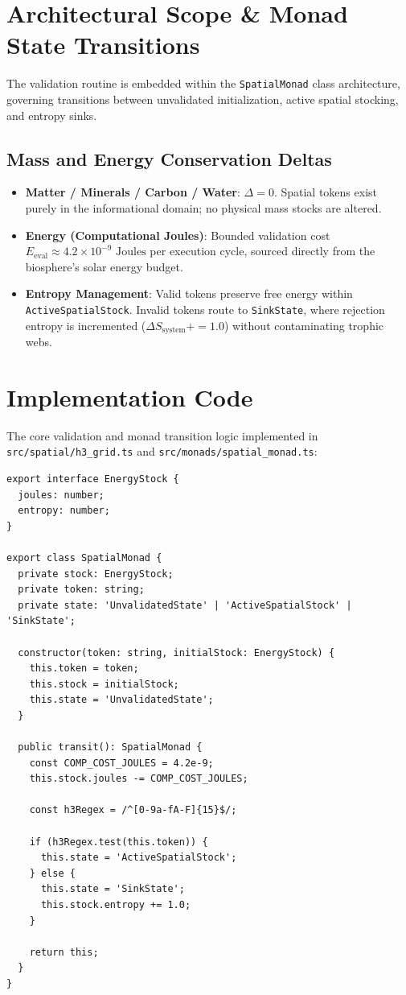 \documentclass[11pt, a4paper]{article}
\begin{document}
\section{Architectural Scope \& Monad State Transitions}
The validation routine is embedded within the \texttt{SpatialMonad} class architecture, governing transitions between unvalidated initialization, active spatial stocking, and entropy sinks.

\subsection{Mass and Energy Conservation Deltas}
\begin{itemize}
    \item \textbf{Matter / Minerals / Carbon / Water}: $\Delta = 0$. Spatial tokens exist purely in the informational domain; no physical mass stocks are altered.
    \item \textbf{Energy (Computational Joules)}: Bounded validation cost $E_{\text{eval}} \approx 4.2 \times 10^{-9}\text{ Joules}$ per execution cycle, sourced directly from the biosphere's solar energy budget.
    \item \textbf{Entropy Management}: Valid tokens preserve free energy within \texttt{ActiveSpatialStock}. Invalid tokens route to \texttt{SinkState}, where rejection entropy is incremented ($\Delta S_{\text{system}} += 1.0$) without contaminating trophic webs.
\end{itemize}

\section{Implementation Code}
The core validation and monad transition logic implemented in \texttt{src/spatial/h3\_grid.ts} and \texttt{src/monads/spatial\_monad.ts}:

\begin{lstlisting}[caption={Spatial Monad Regex Validation Routine}]
export interface EnergyStock {
  joules: number;
  entropy: number;
}

export class SpatialMonad {
  private stock: EnergyStock;
  private token: string;
  private state: 'UnvalidatedState' | 'ActiveSpatialStock' | 'SinkState';

  constructor(token: string, initialStock: EnergyStock) {
    this.token = token;
    this.stock = initialStock;
    this.state = 'UnvalidatedState';
  }

  public transit(): SpatialMonad {
    const COMP_COST_JOULES = 4.2e-9;
    this.stock.joules -= COMP_COST_JOULES;

    const h3Regex = /^[0-9a-fA-F]{15}$/;

    if (h3Regex.test(this.token)) {
      this.state = 'ActiveSpatialStock';
    } else {
      this.state = 'SinkState';
      this.stock.entropy += 1.0;
    }

    return this;
  }
}
\end{lstlisting}
\end{document}
